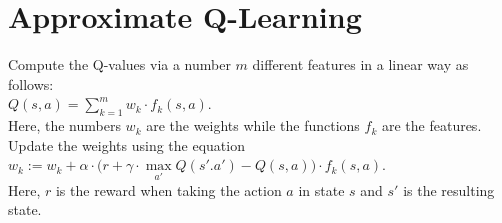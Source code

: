\section{Approximate Q-Learning}
Compute the Q-values via a number $m$ different features in a linear way as follows:
\\[0.2cm]
\hspace*{1.3cm}
$Q(s,a) = \sum\limits_{k=1}^m w_k \cdot f_k(s,a)$.
\\[0.2cm]
Here, the numbers $w_k$ are the weights while the functions $f_k$ are the features.  Update the
weights using the equation
\\[0.2cm]
\hspace*{1.3cm}
$w_k := w_k + \alpha \cdot  \bigl(r + \gamma \cdot \max\limits_{a'} Q(s'.a') - Q(s,a)\bigr) \cdot f_k(s, a)$.
\\[0.2cm]
Here, $r$ is the reward when taking the action $a$ in state $s$ and $s'$ is the resulting state.


